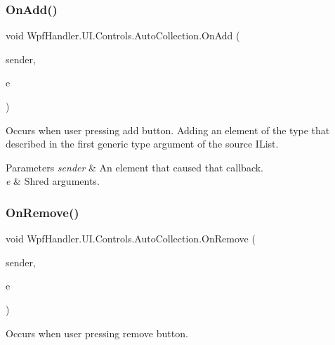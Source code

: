 \subsubsection{\texorpdfstring{On\+Add()}{OnAdd()}}
{\footnotesize\ttfamily void Wpf\+Handler.\+U\+I.\+Controls.\+Auto\+Collection.\+On\+Add (\begin{DoxyParamCaption}\item[{object}]{sender,  }\item[{Routed\+Event\+Args}]{e }\end{DoxyParamCaption})\hspace{0.3cm}{\ttfamily [protected]}}



Occurs when user pressing add button. Adding an element of the type that described in the first generic type argument of the source I\+List. 


\begin{DoxyParams}{Parameters}
{\em sender} & An element that caused that callback.\\
\hline
{\em e} & Shred arguments.\\
\hline
\end{DoxyParams}
\mbox{\label{class_wpf_handler_1_1_u_i_1_1_controls_1_1_auto_collection_a782eacc20f715ac1d15e3ca15b96b870}} 
\subsubsection{\texorpdfstring{On\+Remove()}{OnRemove()}}
{\footnotesize\ttfamily void Wpf\+Handler.\+U\+I.\+Controls.\+Auto\+Collection.\+On\+Remove (\begin{DoxyParamCaption}\item[{object}]{sender,  }\item[{Routed\+Event\+Args}]{e }\end{DoxyParamCaption})\hspace{0.3cm}{\ttfamily [protected]}}



Occurs when user pressing remove button. 


